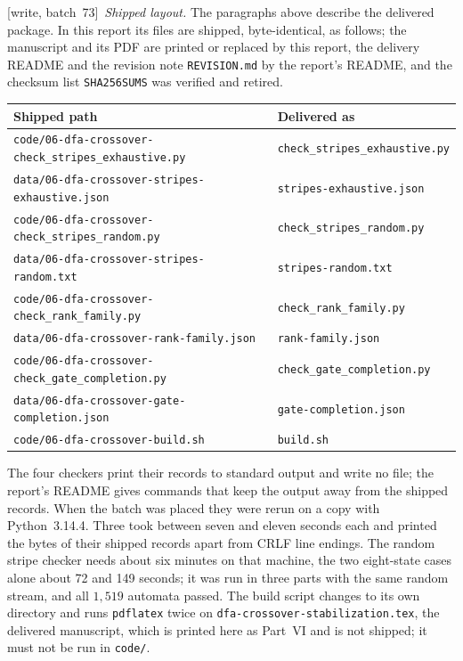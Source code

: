 \documentclass[11pt,letterpaper]{article}
\theoremstyle{definition}
\theoremstyle{remark}
\newcommand{\wsevthree}{\textup{[write, batch~73]}}
\begin{document}
\wsevthree\ \emph{Shipped layout.} The paragraphs above describe the delivered
package. In this report its files are shipped, byte-identical, as follows;
the manuscript and its PDF are printed or replaced by this report, the
delivery README and the revision note \texttt{REVISION.md} by the report's
README, and the checksum list \texttt{SHA256SUMS} was verified and retired.
\begin{center}\footnotesize
\begin{tabular}{@{}P{.62\textwidth}P{.32\textwidth}@{}}
\toprule
\textbf{Shipped path} & \textbf{Delivered as}\\
\midrule
\nolinkurl{code/06-dfa-crossover-check_stripes_exhaustive.py} & \texttt{check\_stripes\_exhaustive.py}\\
\nolinkurl{data/06-dfa-crossover-stripes-exhaustive.json} & \texttt{stripes-exhaustive.json}\\
\nolinkurl{code/06-dfa-crossover-check_stripes_random.py} & \texttt{check\_stripes\_random.py}\\
\nolinkurl{data/06-dfa-crossover-stripes-random.txt} & \texttt{stripes-random.txt}\\
\nolinkurl{code/06-dfa-crossover-check_rank_family.py} & \texttt{check\_rank\_family.py}\\
\nolinkurl{data/06-dfa-crossover-rank-family.json} & \texttt{rank-family.json}\\
\nolinkurl{code/06-dfa-crossover-check_gate_completion.py} & \texttt{check\_gate\_completion.py}\\
\nolinkurl{data/06-dfa-crossover-gate-completion.json} & \texttt{gate-completion.json}\\
\nolinkurl{code/06-dfa-crossover-build.sh} & \texttt{build.sh}\\
\bottomrule
\end{tabular}
\end{center}
The four checkers print their records to standard output and write no file;
the report's README gives commands that keep the output away from the
shipped records. When the batch was placed they were rerun on a copy with
Python~3.14.4. Three took between seven and eleven seconds each and printed
the bytes of their shipped records apart from CRLF line endings. The random
stripe checker needs about six minutes on that machine, the two eight-state
cases alone about 72 and 149 seconds; it was run in three parts with the
same random stream, and all $1{,}519$ automata passed. The build script
changes to its own directory and runs \texttt{pdflatex} twice on
\texttt{dfa-crossover-stabilization.tex}, the delivered manuscript, which is
printed here as Part~VI and is not shipped; it must not be run in
\texttt{code/}.
\end{document}
